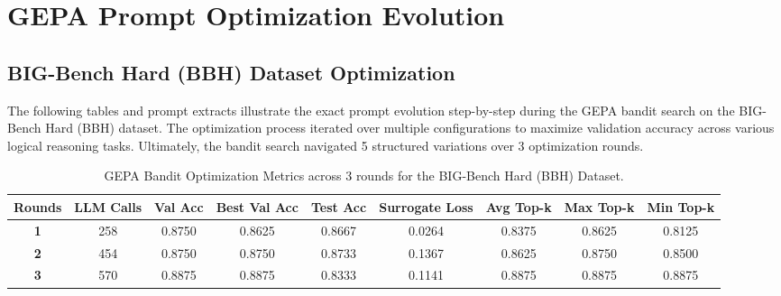 
\chapter{GEPA Prompt Optimization Evolution}

\section{BIG-Bench Hard (BBH) Dataset Optimization}

The following tables and prompt extracts illustrate the exact prompt evolution step-by-step during the GEPA bandit search on the BIG-Bench Hard (BBH) dataset. The optimization process iterated over multiple configurations to maximize validation accuracy across various logical reasoning tasks. Ultimately, the bandit search navigated 5 structured variations over 3 optimization rounds.

\begin{table}[htbp]
    \centering
    \begin{tabular}{ccccccccc}
    \toprule
    \textbf{Rounds} & \textbf{LLM Calls} & \textbf{Val Acc} & \textbf{Best Val Acc} & \textbf{Test Acc} & \textbf{Surrogate Loss} & \textbf{Avg Top-k} & \textbf{Max Top-k} & \textbf{Min Top-k} \\
    \midrule
    \textbf{1} & 258 & 0.8750 & 0.8625 & 0.8667 & 0.0264 & 0.8375 & 0.8625 & 0.8125 \\
    \textbf{2} & 454 & 0.8750 & 0.8750 & 0.8733 & 0.1367 & 0.8625 & 0.8750 & 0.8500 \\
    \textbf{3} & 570 & 0.8875 & 0.8875 & 0.8333 & 0.1141 & 0.8875 & 0.8875 & 0.8875 \\
    \bottomrule
    \end{tabular}
    \caption{GEPA Bandit Optimization Metrics across 3 rounds for the BIG-Bench Hard (BBH) Dataset.}
    \label{tab:bbh_metrics}
\end{table}

\begin{table}[H]
\centering
\caption{Performance on Big Bench Hard (BBH)}


\end{table}

